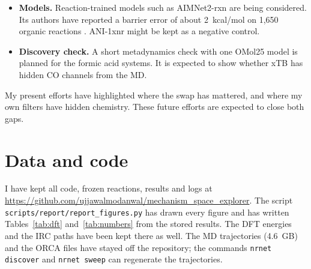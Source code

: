 \documentclass[11pt]{article}
\newcommand{\kcal}{kcal/mol}
\begin{document}
\begin{itemize}
whether the network would change with the model. The second is expected to
take known literature reactions with high-level reference barriers. It is
expected to ask how well each model would reproduce them, and whether the
MD would find them at all.
\item \textbf{Models.} Reaction-trained models such as AIMNet2-rxn are
being considered. Its authors have reported a barrier error of about
2~\kcal{} on 1,650 organic reactions \cite{aimnet2rxn}. ANI-1xnr might be
kept as a negative control.
\item \textbf{Discovery check.} A short metadynamics check with one OMol25
model is planned for the formic acid systems. It is expected to show
whether xTB has hidden CO channels from the MD.
\end{itemize}

\noindent My present efforts have highlighted where the swap has mattered,
and where my own filters have hidden chemistry. These future efforts are
expected to close both gaps.

\section*{Data and code}

I have kept all code, frozen reactions, results and logs at
\url{https://github.com/ujjawalmodanwal/mechanism_space_explorer}. The
script \nolinkurl{scripts/report/report_figures.py} has drawn every figure
and has written Tables~\ref{tab:dft} and~\ref{tab:numbers} from the
stored results. The DFT energies and the IRC paths have been kept there as
well. The MD trajectories (4.6~GB) and the ORCA files have stayed off the
repository; the commands \texttt{nrnet discover} and \texttt{nrnet sweep}
can regenerate the trajectories.
\end{document}
